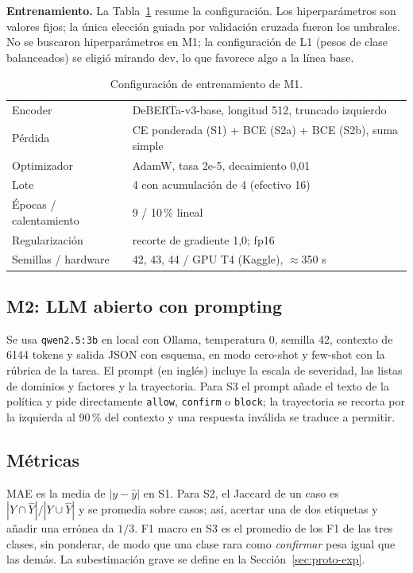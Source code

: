\documentclass[conference]{IEEEtran}
\begin{document}
\textbf{Entrenamiento.} La Tabla~\ref{tab:cfg} resume la configuración. Los hiperparámetros son valores fijos; la única elección guiada por validación cruzada fueron los umbrales. No se buscaron hiperparámetros en M1; la configuración de L1 (pesos de clase balanceados) se eligió mirando dev, lo que favorece algo a la línea base.

\begin{table}[t]
\centering
\caption{Configuración de entrenamiento de M1.}
\label{tab:cfg}
\footnotesize
\begin{tabular}{@{}ll@{}}
\toprule
Encoder & DeBERTa-v3-base, longitud 512, truncado izquierdo \\
Pérdida & CE ponderada (S1) + BCE (S2a) + BCE (S2b), suma simple \\
Optimizador & AdamW, tasa 2e-5, decaimiento 0,01 \\
Lote & 4 con acumulación de 4 (efectivo 16) \\
Épocas / calentamiento & 9 / 10\,\% lineal \\
Regularización & recorte de gradiente 1,0; fp16 \\
Semillas / hardware & 42, 43, 44 / GPU T4 (Kaggle), $\approx$350 s \\
\bottomrule
\end{tabular}
\end{table}

\subsection{M2: LLM abierto con prompting}
Se usa \texttt{qwen2.5:3b} \cite{qwen2025} en local con Ollama, temperatura 0, semilla 42, contexto de 6144 tokens y salida JSON con esquema, en modo cero-shot y few-shot con la rúbrica de la tarea. El prompt (en inglés) incluye la escala de severidad, las listas de dominios y factores y la trayectoria. Para S3 el prompt añade el texto de la política y pide directamente \texttt{allow}, \texttt{confirm} o \texttt{block}; la trayectoria se recorta por la izquierda al 90\,\% del contexto y una respuesta inválida se traduce a permitir.

\subsection{Métricas}
MAE es la media de $|y-\hat y|$ en S1. Para S2, el Jaccard de un caso es $|Y\cap\hat Y|/|Y\cup\hat Y|$ y se promedia sobre casos; así, acertar una de dos etiquetas y añadir una errónea da $1/3$. F1 macro en S3 es el promedio de los F1 de las tres clases, sin ponderar, de modo que una clase rara como \emph{confirmar} pesa igual que las demás. La subestimación grave se define en la Sección~\ref{sec:proto-exp}.
\end{document}
